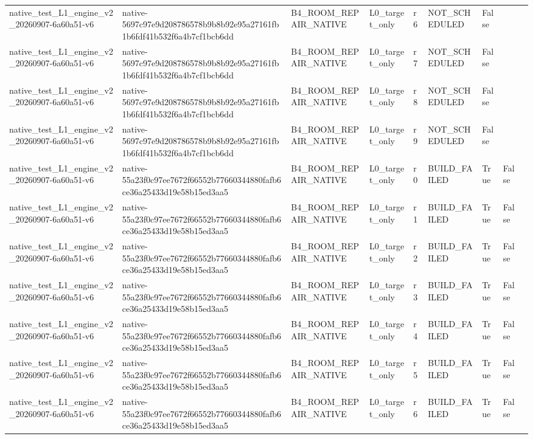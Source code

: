 \begin{tabular}{lllllllll}
native\_test\_L1\_engine\_v2\_20260907-6a60a51-v6 & native-5697c97e9d208786578b9b8b92e95a27161fb1b6fdf41b532f6a4b7cf1bcb6dd & B4\_ROOM\_REPAIR\_NATIVE & L0\_target\_only & r6 & NOT\_SCHEDULED & False &  &  \\
native\_test\_L1\_engine\_v2\_20260907-6a60a51-v6 & native-5697c97e9d208786578b9b8b92e95a27161fb1b6fdf41b532f6a4b7cf1bcb6dd & B4\_ROOM\_REPAIR\_NATIVE & L0\_target\_only & r7 & NOT\_SCHEDULED & False &  &  \\
native\_test\_L1\_engine\_v2\_20260907-6a60a51-v6 & native-5697c97e9d208786578b9b8b92e95a27161fb1b6fdf41b532f6a4b7cf1bcb6dd & B4\_ROOM\_REPAIR\_NATIVE & L0\_target\_only & r8 & NOT\_SCHEDULED & False &  &  \\
native\_test\_L1\_engine\_v2\_20260907-6a60a51-v6 & native-5697c97e9d208786578b9b8b92e95a27161fb1b6fdf41b532f6a4b7cf1bcb6dd & B4\_ROOM\_REPAIR\_NATIVE & L0\_target\_only & r9 & NOT\_SCHEDULED & False &  &  \\
native\_test\_L1\_engine\_v2\_20260907-6a60a51-v6 & native-55a23f0c97ee7672f66552b77660344880fafb6ce36a25433d19e58b15ed3aa5 & B4\_ROOM\_REPAIR\_NATIVE & L0\_target\_only & r0 & BUILD\_FAILED & True & False &  \\
native\_test\_L1\_engine\_v2\_20260907-6a60a51-v6 & native-55a23f0c97ee7672f66552b77660344880fafb6ce36a25433d19e58b15ed3aa5 & B4\_ROOM\_REPAIR\_NATIVE & L0\_target\_only & r1 & BUILD\_FAILED & True & False &  \\
native\_test\_L1\_engine\_v2\_20260907-6a60a51-v6 & native-55a23f0c97ee7672f66552b77660344880fafb6ce36a25433d19e58b15ed3aa5 & B4\_ROOM\_REPAIR\_NATIVE & L0\_target\_only & r2 & BUILD\_FAILED & True & False &  \\
native\_test\_L1\_engine\_v2\_20260907-6a60a51-v6 & native-55a23f0c97ee7672f66552b77660344880fafb6ce36a25433d19e58b15ed3aa5 & B4\_ROOM\_REPAIR\_NATIVE & L0\_target\_only & r3 & BUILD\_FAILED & True & False &  \\
native\_test\_L1\_engine\_v2\_20260907-6a60a51-v6 & native-55a23f0c97ee7672f66552b77660344880fafb6ce36a25433d19e58b15ed3aa5 & B4\_ROOM\_REPAIR\_NATIVE & L0\_target\_only & r4 & BUILD\_FAILED & True & False &  \\
native\_test\_L1\_engine\_v2\_20260907-6a60a51-v6 & native-55a23f0c97ee7672f66552b77660344880fafb6ce36a25433d19e58b15ed3aa5 & B4\_ROOM\_REPAIR\_NATIVE & L0\_target\_only & r5 & BUILD\_FAILED & True & False &  \\
native\_test\_L1\_engine\_v2\_20260907-6a60a51-v6 & native-55a23f0c97ee7672f66552b77660344880fafb6ce36a25433d19e58b15ed3aa5 & B4\_ROOM\_REPAIR\_NATIVE & L0\_target\_only & r6 & BUILD\_FAILED & True & False &  \\

\end{tabular}
